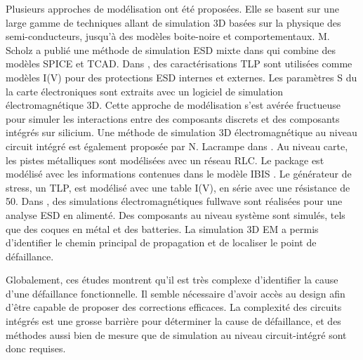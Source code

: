 Plusieurs approches de modélisation ont été proposées.
Elle se basent sur une large gamme de techniques allant de simulation 3D basées sur la physique des semi-conducteurs, jusqu'à des modèles boite-noire et comportementaux.
M. Scholz a publié une méthode de simulation ESD mixte dans \cite{mixedModeESDSims} qui combine des modèles SPICE et TCAD.
Dans \cite{usb2ESDProtection}, des caractérisations TLP sont utilisées comme modèles I(V) pour des protections ESD internes et externes.
Les paramètres S du la carte électroniques sont extraits avec un logiciel de simulation électromagnétique 3D.
Cette approche de modélisation s'est avérée fructueuse pour simuler les interactions entre des composants discrets et des composants intégrés sur silicium.
Une méthode de simulation 3D électromagnétique au niveau circuit intégré est également proposée par N. Lacrampe dans \cite{LacrampeTransientImmunity}.
Au niveau carte, les pistes métalliques sont modélisées avec un réseau RLC.
Le package est modélisé avec les informations contenues dans le modèle IBIS \cite{ibis-spec}.
Le générateur de stress, un TLP, est modélisé avec une table I(V), en série avec une résistance de 50\textOmega{}.
Dans \cite{softFailMobile}, des simulations électromagnétiques fullwave sont réalisées pour une analyse ESD en alimenté.
Des composants au niveau système sont simulés, tels que des coques en métal et des batteries.
La simulation 3D EM a permis d'identifier le chemin principal de propagation et de localiser le point de défaillance.

Globalement, ces études montrent qu'il est très complexe d'identifier la cause d'une défaillance fonctionnelle.
Il semble nécessaire d'avoir accès au design afin d'être capable de proposer des corrections efficaces.
La complexité des circuits intégrés est une grosse barrière pour déterminer la cause de défaillance, et des méthodes aussi bien de mesure que de simulation au niveau circuit-intégré sont donc requises.
